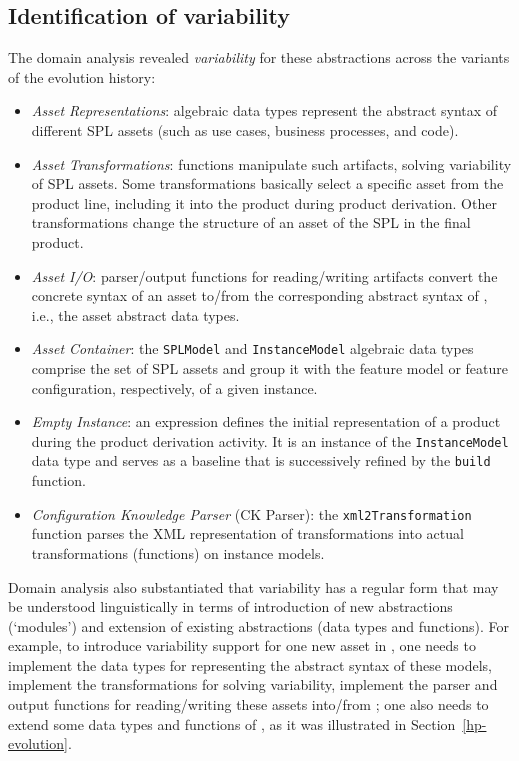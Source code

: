 
\subsection{Identification of variability} 
\label{variability}

The domain analysis revealed \emph{variability} for these abstractions across the variants of the evolution history:

\begin{itemize}

\item \emph{Asset Representations}: algebraic data types represent the abstract syntax of different SPL assets (such as use cases, business processes, and code).

\item \emph{Asset Transformations}: functions manipulate such artifacts, solving variability of SPL assets. Some transformations basically select a specific asset from the product line, including it into the product during product derivation. Other transformations change the structure of an asset of the SPL in the final product.

\item \emph{Asset I/O}: parser/output functions for reading/writing artifacts convert the concrete syntax of an asset to/from the corresponding abstract syntax of \hpl{}, i.e., the asset abstract data types.

\item \emph{Asset Container}: the \texttt{SPLModel} and \texttt{InstanceModel} algebraic data types comprise the set of SPL assets and group it with the feature model or feature configuration, respectively, of a given \hpl{} instance.

\item \emph{Empty Instance}: an expression defines the initial representation of a product during the product derivation activity. It is an instance of the \texttt{InstanceModel} data type and serves as a baseline that is successively refined by the \texttt{build} function.

\item \emph{Configuration Knowledge Parser} (CK Parser): the \texttt{xml2Transformation} function parses the XML representation of transformations into actual transformations (functions) on instance models.

\end{itemize}

Domain analysis also substantiated that variability has a regular form that may be understood linguistically in terms of introduction of new abstractions (`modules') and extension of existing abstractions (data types and functions). For example, to introduce variability support for one new asset in \hp, one needs to implement the data types for representing the abstract syntax of these models, implement the transformations for solving variability, implement the parser and output functions for reading/writing these assets into/from \hp; one also needs to extend some data types and functions of \hp{}, as it was illustrated in Section~\ref{hp-evolution}.
